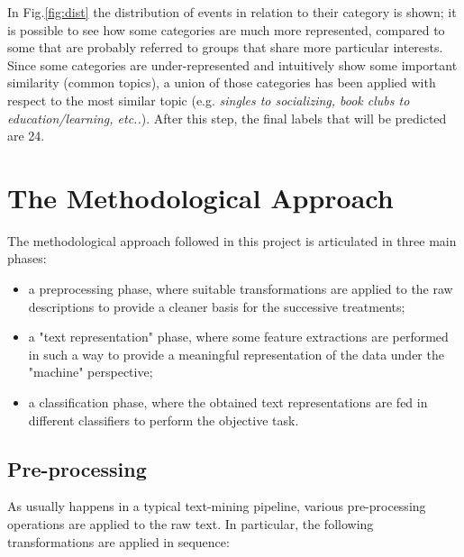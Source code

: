 \documentclass[10pt]{article}
\begin{document}
In Fig.\ref{fig:dist}  the distribution of events in relation to their category is shown; it is possible to see how some categories are much more represented, compared to some that are probably referred to groups that share more particular interests.
Since some categories are under-represented and intuitively show some important similarity (common topics), a union of those categories has been applied with respect to the most similar topic (e.g. \textit{singles to socializing, book clubs to education/learning, etc..}). 
After this step, the final labels that will be predicted are 24.

\section{The Methodological Approach \label{sec:methods}}

The methodological approach followed in this project is articulated in three main phases: 
\begin{itemize}
\item a preprocessing phase, where suitable transformations are applied to the raw descriptions to provide a cleaner basis for the successive treatments;
\item a "text representation" phase, where some feature extractions are performed in such a way to provide a meaningful representation of the data under the "machine" perspective;
\item a classification phase, where the obtained text representations are fed in different classifiers to perform the objective task.
\end{itemize}
\subsection{Pre-processing \label{subsec:preprocessing}}
As usually happens in a typical text-mining pipeline, various pre-processing operations are applied to the raw text. 
In particular, the following transformations are applied in sequence:
\end{document}
